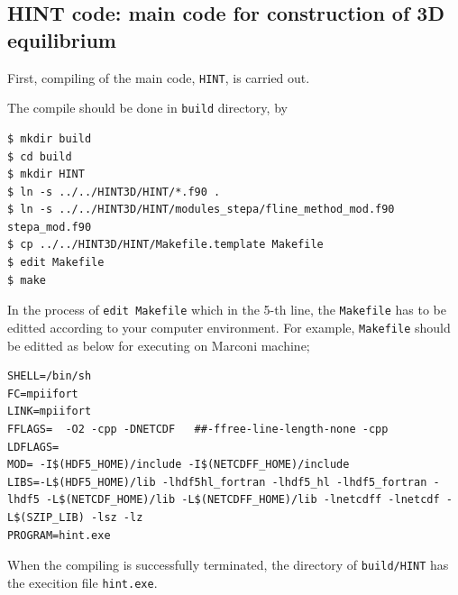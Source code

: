 \documentclass[10pt]{ltxdoc} %
\begin{document}
\subsection{HINT code: main code for construction of 3D equilibrium}
First, compiling of the main code, \texttt{HINT}, is carried out. 

The compile should be done in \texttt{build} directory, by
\vspace{2mm}
\begin{verbatim}
$ mkdir build
$ cd build
$ mkdir HINT
$ ln -s ../../HINT3D/HINT/*.f90 . 
$ ln -s ../../HINT3D/HINT/modules_stepa/fline_method_mod.f90 stepa_mod.f90
$ cp ../../HINT3D/HINT/Makefile.template Makefile
$ edit Makefile
$ make
\end{verbatim}
\vspace{2mm}

In the process of \texttt{edit Makefile} which in the 5-th line, the \texttt{Makefile} has to be editted according to your computer environment. 
For example, \texttt{Makefile} should be editted as below for executing on Marconi machine;
\vspace{2mm}
\begin{verbatim}
SHELL=/bin/sh
FC=mpiifort
LINK=mpiifort
FFLAGS=  -O2 -cpp -DNETCDF   ##-ffree-line-length-none -cpp
LDFLAGS=
MOD= -I$(HDF5_HOME)/include -I$(NETCDFF_HOME)/include
LIBS=-L$(HDF5_HOME)/lib -lhdf5hl_fortran -lhdf5_hl -lhdf5_fortran -lhdf5 -L$(NETCDF_HOME)/lib -L$(NETCDFF_HOME)/lib -lnetcdff -lnetcdf -L$(SZIP_LIB) -lsz -lz
PROGRAM=hint.exe
\end{verbatim}
\vspace{2mm}

When the compiling is successfully terminated, the directory of \texttt{build/HINT} has the execition file \texttt{hint.exe}. 
\end{document}

